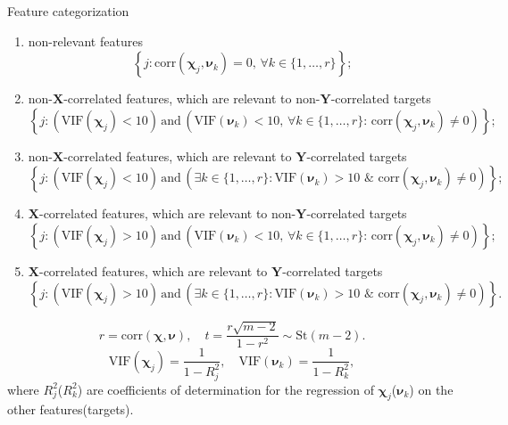 \documentclass[9pt]{beamer}
\newcommand{\bY}{\mathbf{Y}}
\newcommand{\bX}{\mathbf{X}}
\newcommand{\bchi}{\boldsymbol{\chi}}
\newcommand{\bnu}{\boldsymbol{\nu}}
\begin{document}
\begin{frame}{Feature categorization}
	\begin{enumerate}
		\item non-relevant features
		\[
		\left\{j: \text{corr}(\bchi_j, \bnu_k) = 0, \, \forall k \in \{1, \dots, r\}\right\};
		\]
		\item non-$\bX$-correlated features, which are relevant to non-$\bY$-correlated targets
		\[
		\left\{j: \left(\text{VIF}(\bchi_j) < 10\right) \, \text{and} \, \left(\text{VIF}(\bnu_k) < 10 , \, \forall k \in \{1, \dots, r\}: \,  \text{corr}(\bchi_j, \bnu_k) \neq 0 \right)\right\};
		\]
		\item non-$\bX$-correlated features, which are relevant to $\bY$-correlated targets
		\[
		\left\{j: \left(\text{VIF}(\bchi_j) < 10\right) \, \text{and} \, \left( \exists k \in \{1, \dots, r\}: \text{VIF}(\bnu_k) > 10 \,\, \& \,\, \text{corr}(\bchi_j, \bnu_k) \neq 0 \right)\right\};
		\]
		\item $\bX$-correlated features, which are relevant to non-$\bY$-correlated targets
		\[
		\left\{j: \left(\text{VIF}(\bchi_j) > 10\right) \, \text{and} \, \left(\text{VIF}(\bnu_k) < 10 , \, \forall k \in \{1, \dots, r\}: \,  \text{corr}(\bchi_j, \bnu_k) \neq 0 \right)\right\};
		\]
		\item $\bX$-correlated features, which are relevant to $\bY$-correlated targets
		\[
		\left\{j: \left(\text{VIF}(\bchi_j) > 10\right) \, \text{and} \, \left( \exists k \in \{1, \dots, r\}: \text{VIF}(\bnu_k) > 10 \,\, \& \,\, \text{corr}(\bchi_j, \bnu_k) \neq 0 \right)\right\}.
		\]
	\end{enumerate}
	
	\[
	r = \text{corr} (\bchi, \bnu), \quad t = \frac{r \sqrt{m - 2}}{1 - r^2} \sim \text{St} (m - 2).
	\]
	\[
	\text{VIF}(\bchi_j) = \frac{1}{1 - R_j^2}, \quad \text{VIF}(\bnu_k) = \frac{1}{1 - R_k^2},
	\]
	where $R_j^2$($R_k^2$) are coefficients of determination for the regression of $\bchi_j$($\bnu_k$) on the other features(targets).
\end{frame}
\end{document}
